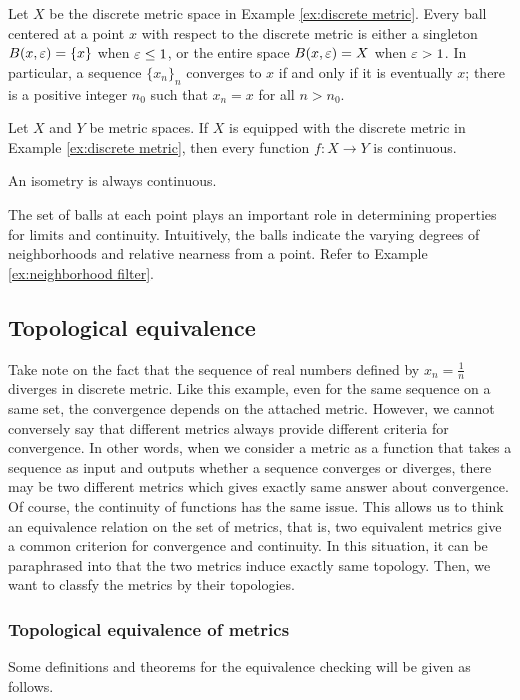 \documentclass{../crs}
\begin{document}
\begin{ex}
Let $X$ be the discrete metric space in Example \ref{ex:discrete metric}.
Every ball centered at a point $x$ with respect to the discrete metric is either a singleton $B(x,\varepsilon)=\{x\}$ when $\varepsilon\le1$, or the entire space $B(x,\varepsilon)=X$ when $\varepsilon>1$.
In particular, a sequence $\{x_n\}_n$ converges to $x$ if and only if it is eventually $x$; there is a positive integer $n_0$ such that $x_n=x$ for all $n>n_0$.
\end{ex}
\begin{ex}
Let $X$ and $Y$ be metric spaces.
If $X$ is equipped with the discrete metric in Example \ref{ex:discrete metric}, then every function $f:X\to Y$ is continuous.
\end{ex}
\begin{ex}
An isometry is always continuous.
\end{ex}

The set of balls at each point plays an important role in determining properties for limits and continuity.
Intuitively, the balls indicate the varying degrees of neighborhoods and relative nearness from a point.
Refer to Example \ref{ex:neighborhood filter}.



\subsection{Topological equivalence}
Take note on the fact that the sequence of real numbers defined by $x_n=\frac1n$ diverges in discrete metric.
Like this example, even for the same sequence on a same set, the convergence depends on the attached metric.
However, we cannot conversely say that different metrics always provide different criteria for convergence.
In other words, when we consider a metric as a function that takes a sequence as input and outputs whether a sequence converges or diverges, there may be two different metrics which gives exactly same answer about convergence.
Of course, the continuity of functions has the same issue.
This allows us to think an equivalence relation on the set of metrics, that is, two equivalent metrics give a common criterion for convergence and continuity.
In this situation, it can be paraphrased into that the two metrics induce exactly same topology.
Then, we want to classfy the metrics by their topologies.

\subsubsection{Topological equivalence of metrics}
Some definitions and theorems for the equivalence checking will be given as follows.
\end{document}
